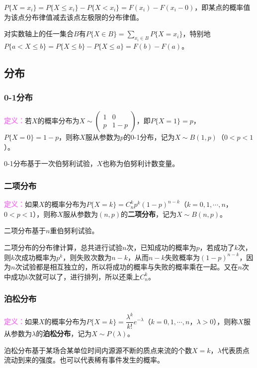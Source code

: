 \documentclass[UTF8, 12pt]{ctexart}
\begin{document}
$P\{X=x_i\}=P\{X\leqslant x_i\}-P\{X<x_i\}=F(x_i)-F(x_i-0)$，即某点的概率值为该点分布律值减去该点左极限的分布律值。

对实数轴上的任一集合$B$有$P\{X\in B\}=\sum\limits_{x_i\in B}P\{X=x_i\}$，特别地$P\{a<X\leqslant b\}=P\{X\leqslant b\}-P\{X\leqslant a\}=F(b)-F(a)$。

\subsection{分布}

\subsubsection{0-1分布}

\textcolor{violet}{\textbf{定义：}}若$X$的概率分布为$X\sim\left(\begin{array}{cc}
    1 & 0 \\
    p & 1-p
\end{array}\right)$，即$P\{X=1\}=p$，$P\{X=0\}=1-p$，则称$X$服从参数为$p$的0-1分布，记为$X\sim B(1,p)$（$0<p<1$）。

0-1分布基于一次伯努利试验，$X$也称为伯努利计数变量。

\subsubsection{二项分布}

\textcolor{violet}{\textbf{定义：}}如果$X$的概率分布为$P\{X=k\}=C_n^kp^k(1-p)^{n-k}$（$k=0,1,\cdots,n$，$0<p<1$），则称$X$服从参数为$(n,p)$的\textbf{二项分布}，记为$X\sim B(n,p)$。

二项分布基于$n$重伯努利试验。

二项分布的分布律计算，总共进行试验$n$次，已知成功的概率为$p$，若成功了$k$次，则$k$次成功概率为$p^k$，则失败次数为$n-k$，从而$n-k$失败概率为$(1-p)^{n-k}$，因为$n$次试验都是相互独立的，所以将成功的概率与失败的概率乘在一起。又在$n$次中成功$k$次就可以了，进行排列，所以还乘上$C_n^k$。

\subsubsection{泊松分布}

\textcolor{violet}{\textbf{定义：}}如果$X$的概率分布为$P\{X=k\}=\dfrac{\lambda^k}{k!}e^{-\lambda}$（$k=0,1,\cdots,n$，$\lambda>0$），则称$X$服从参数为$\lambda$的\textbf{泊松分布}，记为$X\sim P(\lambda)$。

泊松分布基于某场合某单位时间内源源不断的质点来流的个数$X=k$，$\lambda$代表质点流动到来的强度。也可以代表稀有事件发生的概率。
\end{document}

